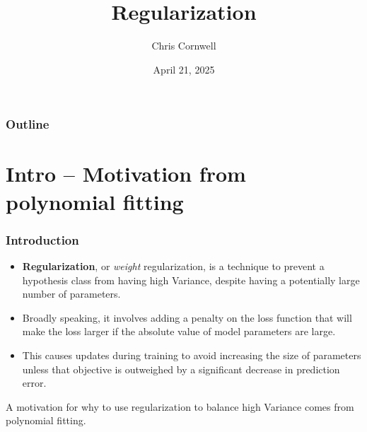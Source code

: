 \documentclass[smaller]{beamer}
\author{Chris Cornwell}
\date{April 21, 2025}
\title{Regularization}
\theoremstyle{example}
\begin{document}
\begin{frame}
\titlepage
\end{frame}

\begin{frame}
    \frametitle{Outline}
    \tableofcontents
\end{frame}

\section{Intro {--} Motivation from polynomial fitting}

\begin{frame}
    \frametitle{Introduction}
    \begin{itemize}
        \item \textbf{Regularization}, or \textit{weight} regularization, is a technique to prevent a hypothesis class from having high Variance, despite having a potentially large number of parameters. 
        \pause
        \item Broadly speaking, it involves adding a penalty on the loss function that will make the loss larger if the absolute value of model parameters are large.
        \pause
        \item This causes updates during training to avoid increasing the size of parameters unless that objective is outweighed by a significant decrease in prediction error.
    \end{itemize}

    \pause
    A motivation for why to use regularization to balance high Variance comes from polynomial fitting.
\end{frame}
\end{document}
